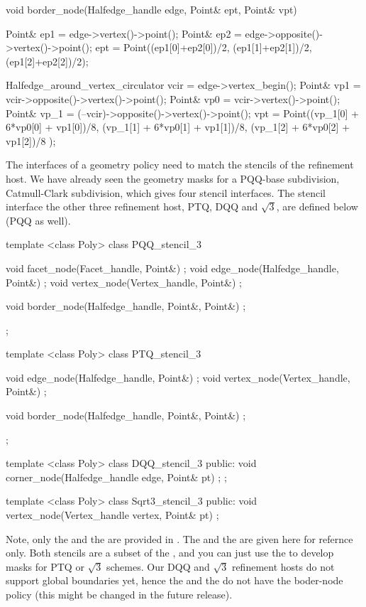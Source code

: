 

\begin{ccExampleCode}
  void border_node(Halfedge_handle edge, Point& ept, Point& vpt) {
    Point& ep1 = edge->vertex()->point();
    Point& ep2 = edge->opposite()->vertex()->point();
    ept = Point((ep1[0]+ep2[0])/2, (ep1[1]+ep2[1])/2, (ep1[2]+ep2[2])/2);

    Halfedge_around_vertex_circulator vcir = edge->vertex_begin();
    Point& vp1  = vcir->opposite()->vertex()->point();
    Point& vp0  = vcir->vertex()->point();
    Point& vp_1 = (--vcir)->opposite()->vertex()->point();
    vpt = Point((vp_1[0] + 6*vp0[0] + vp1[0])/8,
                (vp_1[1] + 6*vp0[1] + vp1[1])/8,
                (vp_1[2] + 6*vp0[2] + vp1[2])/8 );
  }
\end{ccExampleCode}


The interfaces of a geometry policy need to match the stencils of 
the refinement host. We have already seen the geometry masks for
a PQQ-base subdivision, Catmull-Clark subdivision, which gives
four stencil interfaces. The stencil interface the other three 
refinement host, PTQ, DQQ and $\sqrt{3}$, are defined below 
(PQQ as well).


\begin{ccExampleCode}
template <class Poly>
class PQQ_stencil_3 {
  void facet_node(Facet_handle, Point&) {};
  void edge_node(Halfedge_handle, Point&) {};
  void vertex_node(Vertex_handle, Point&) {};

  void border_node(Halfedge_handle, Point&, Point&) {};
};

template <class Poly>
class PTQ_stencil_3 {
  void edge_node(Halfedge_handle, Point&) {};
  void vertex_node(Vertex_handle, Point&) {};

  void border_node(Halfedge_handle, Point&, Point&) {};
};

template <class Poly>
class DQQ_stencil_3 {
public:
  void corner_node(Halfedge_handle edge, Point& pt) {};
};

template <class Poly>
class Sqrt3_stencil_3 {
public:
  void vertex_node(Vertex_handle vertex, Point& pt) {}
};
\end{ccExampleCode}

Note, only the  and the 
are provided in .
The  and the  are given
here for refernce only. Both stencils are a subset of the
, and you can just use the 
 to develop masks for PTQ or $\sqrt{3}$ 
schemes. Our DQQ and $\sqrt{3}$ refinement hosts do
not support global boundaries yet, hence the
 and the  do not
have the boder-node policy (this might be changed in the 
future release). 


